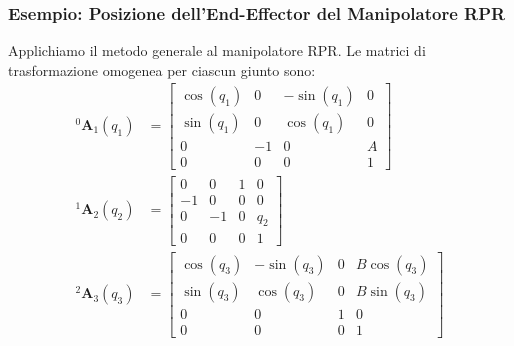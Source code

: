 ﻿\documentclass[11pt, a4paper]{article}
\begin{document}
\newpage


\subsubsection*{Esempio: Posizione dell'End-Effector del Manipolatore RPR}

Applichiamo il metodo generale al manipolatore RPR. Le matrici di trasformazione omogenea per ciascun giunto sono:
\begin{align*}
    ^{0}\bm{A}_{1}(q_{1}) &=
    \begin{bmatrix}
        \cos(q_{1}) & 0 & -\sin(q_{1}) & 0\\
        \sin(q_{1}) & 0 & \cos(q_{1}) & 0\\
        0 & -1 & 0 & A\\
        0 & 0 & 0 & 1
    \end{bmatrix} \\
    ^{1}\bm{A}_{2}(q_{2}) &=
    \begin{bmatrix}
        0 & 0 & 1 & 0\\
        -1 & 0 & 0 & 0\\
        0 & -1 & 0 & q_{2}\\
        0 & 0 & 0 & 1
    \end{bmatrix} \\
    ^{2}\bm{A}_{3}(q_{3}) &=
    \begin{bmatrix}
        \cos(q_{3}) & -\sin(q_{3}) & 0 & B\cos(q_{3})\\
        \sin(q_{3}) & \cos(q_{3}) & 0 & B\sin(q_{3})\\
        0 & 0 & 1 & 0\\
        0 & 0 & 0 & 1
    \end{bmatrix}
\end{align*}
\end{document}
